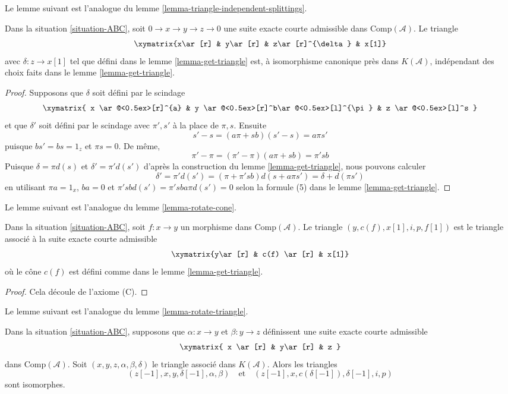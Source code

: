 \noindent
Le lemme suivant est l'analogue du
lemme \ref{lemma-triangle-independent-splittings}.

\begin{lemma}
\label{lemma-analogue-triangle-independent-splittings}
Dans la situation
\ref{situation-ABC}, soit $0 \to x \to y \to z \to 0$ une suite exacte
courte admissible dans $\text{Comp}(\mathcal{A})$. Le triangle
$$
\xymatrix{x\ar[r] & y\ar[r] & z\ar[r]^{\delta} & x[1]}
$$
avec $\delta : z \to x[1]$ tel que défini dans le lemme
\ref{lemma-get-triangle} est, à isomorphisme canonique près dans $K(\mathcal{A})$, indépendant des
choix faits dans le lemme \ref{lemma-get-triangle}.
\end{lemma}

\begin{proof}
Supposons que $\delta$ soit défini par le scindage
$$
\xymatrix{
x \ar@<0.5ex>[r]^{a} &
y \ar@<0.5ex>[r]^b\ar@<0.5ex>[l]^{\pi} & z
\ar@<0.5ex>[l]^s
}
$$
et que $\delta'$ soit défini par le scindage avec $\pi',s'$ à
la place de $\pi,s$. Ensuite
$$
s'-s = (a\pi + sb)(s'-s) = a\pi s'
$$
puisque $bs' = bs = 1_z$ et $\pi s = 0$. De même,
$$
\pi' - \pi = (\pi' - \pi)(a\pi + sb) = \pi'sb
$$
Puisque $\delta = \pi d(s)$ et $\delta' = \pi'd(s')$
d'après la construction du lemme \ref{lemma-get-triangle}, nous pouvons calculer
$$
\delta' = \pi'd(s') = (\pi + \pi'sb)d(s + a\pi s') = \delta + d(\pi s')
$$
en utilisant $\pi a = 1_x$, $ba = 0$ et $\pi'sbd(s') = \pi'sba\pi d(s') = 0$
selon la formule (5) dans le lemme \ref{lemma-get-triangle}.
\end{proof}

\noindent
Le lemme suivant est l'analogue du lemme \ref{lemma-rotate-cone}.

\begin{lemma}
\label{lemma-restate-axiom-c}
Dans la situation
\ref{situation-ABC}, soit $f: x \to y$ un morphisme dans
$\text{Comp}(\mathcal{A})$. Le triangle $(y, c(f), x[1], i, p, f[1])$ est le triangle
associé à la suite exacte courte admissible
$$
\xymatrix{y\ar[r] & c(f) \ar[r] & x[1]}
$$
où le cône $c(f)$ est défini comme dans le lemme \ref{lemma-get-triangle}.
\end{lemma}

\begin{proof}
Cela découle de l'axiome (C).
\end{proof}

\noindent
Le lemme suivant est l'analogue du lemme \ref{lemma-rotate-triangle}.

\begin{lemma}
\label{lemma-cone-rotate-isom}
Dans la situation \ref{situation-ABC}, supposons que $\alpha : x \to y$ et $\beta : y \to
z$ définissent une suite exacte courte admissible
$$
\xymatrix{
x \ar[r] &
y\ar[r] &
z
}
$$
dans $\text{Comp}(\mathcal{A})$. Soit $(x, y, z, \alpha, \beta,
\delta)$ le triangle associé dans $K(\mathcal{A})$. Alors les triangles
$$
(z[-1], x, y, \delta[-1], \alpha, \beta)
\quad\text{et}\quad
(z[-1], x, c(\delta[-1]), \delta[-1], i, p)
$$
sont isomorphes.
\end{lemma}

